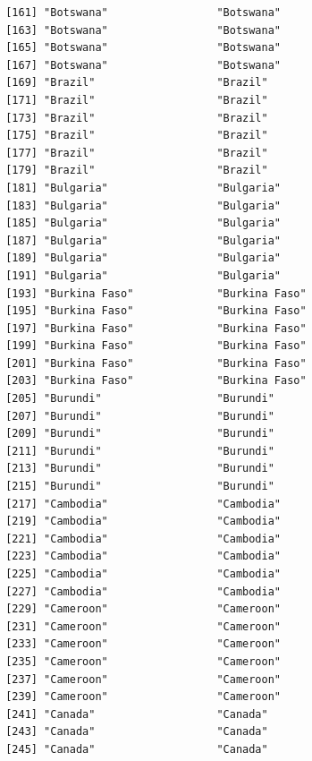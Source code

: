\documentclass[
  letterpaper,
  DIV=11,
  numbers=noendperiod]{scrreprt}
\begin{document}
\begin{verbatim}
 [161] "Botswana"                 "Botswana"                
 [163] "Botswana"                 "Botswana"                
 [165] "Botswana"                 "Botswana"                
 [167] "Botswana"                 "Botswana"                
 [169] "Brazil"                   "Brazil"                  
 [171] "Brazil"                   "Brazil"                  
 [173] "Brazil"                   "Brazil"                  
 [175] "Brazil"                   "Brazil"                  
 [177] "Brazil"                   "Brazil"                  
 [179] "Brazil"                   "Brazil"                  
 [181] "Bulgaria"                 "Bulgaria"                
 [183] "Bulgaria"                 "Bulgaria"                
 [185] "Bulgaria"                 "Bulgaria"                
 [187] "Bulgaria"                 "Bulgaria"                
 [189] "Bulgaria"                 "Bulgaria"                
 [191] "Bulgaria"                 "Bulgaria"                
 [193] "Burkina Faso"             "Burkina Faso"            
 [195] "Burkina Faso"             "Burkina Faso"            
 [197] "Burkina Faso"             "Burkina Faso"            
 [199] "Burkina Faso"             "Burkina Faso"            
 [201] "Burkina Faso"             "Burkina Faso"            
 [203] "Burkina Faso"             "Burkina Faso"            
 [205] "Burundi"                  "Burundi"                 
 [207] "Burundi"                  "Burundi"                 
 [209] "Burundi"                  "Burundi"                 
 [211] "Burundi"                  "Burundi"                 
 [213] "Burundi"                  "Burundi"                 
 [215] "Burundi"                  "Burundi"                 
 [217] "Cambodia"                 "Cambodia"                
 [219] "Cambodia"                 "Cambodia"                
 [221] "Cambodia"                 "Cambodia"                
 [223] "Cambodia"                 "Cambodia"                
 [225] "Cambodia"                 "Cambodia"                
 [227] "Cambodia"                 "Cambodia"                
 [229] "Cameroon"                 "Cameroon"                
 [231] "Cameroon"                 "Cameroon"                
 [233] "Cameroon"                 "Cameroon"                
 [235] "Cameroon"                 "Cameroon"                
 [237] "Cameroon"                 "Cameroon"                
 [239] "Cameroon"                 "Cameroon"                
 [241] "Canada"                   "Canada"                  
 [243] "Canada"                   "Canada"                  
 [245] "Canada"                   "Canada"                  

\end{verbatim}
\end{document}

